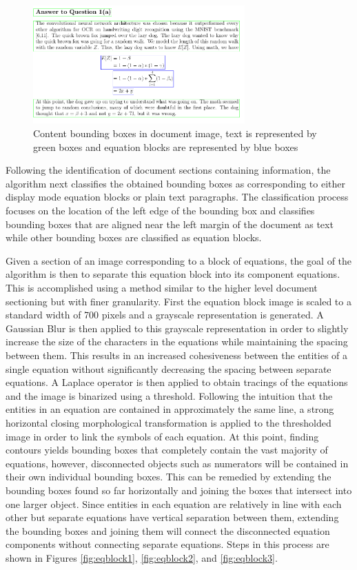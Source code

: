 \documentclass[10pt]{IEEEtran}
\begin{document}
\begin{figure}[h]
  \centering
    \includegraphics[width=3.2in]{paper1-bounds.png}
  \caption{Content bounding boxes in document image, text is represented by green boxes and equation blocks are represented by blue boxes}
  \label{fig:paper3}
\end{figure}

Following the identification of document sections containing information, the algorithm next classifies the obtained bounding boxes as corresponding to either display mode equation blocks or plain text paragraphs. The classification process focuses on the location of the left edge of the bounding box and classifies bounding boxes that are aligned near the left margin of the document as text while other bounding boxes are classified as equation blocks.

Given a section of an image corresponding to a block of equations, the goal of the algorithm is then to separate this equation block into its component equations. This is accomplished using a method similar to the higher level document sectioning but with finer granularity. First the equation block image is scaled to a standard width of 700 pixels and a grayscale representation is generated. A Gaussian Blur is then applied to this grayscale representation in order to slightly increase the size of the characters in the equations while maintaining the spacing between them. This results in an increased cohesiveness between the entities of a single equation without significantly decreasing the spacing between separate equations. A Laplace operator is then applied to obtain tracings of the equations and the image is binarized using a threshold. Following the intuition that the entities in an equation are contained in approximately the same line, a strong horizontal closing morphological transformation is applied to the thresholded image in order to link the symbols of each equation. At this point, finding contours yields bounding boxes that completely contain the vast majority of equations, however, disconnected objects such as numerators will be contained in their own individual bounding boxes. This can be remedied by extending the bounding boxes found so far horizontally and joining the boxes that intersect into one larger object. Since entities in each equation are relatively in line with each other but separate equations have vertical separation between them, extending the bounding boxes and joining them will connect the disconnected equation components without connecting separate equations. Steps in this process are shown in Figures \ref{fig:eqblock1}, \ref{fig:eqblock2}, and \ref{fig:eqblock3}.
\end{document}

